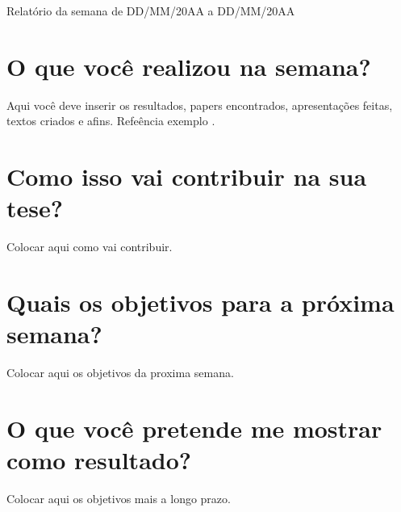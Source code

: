 
\begin{resumo} 
  Relatório da semana de DD/MM/20AA a DD/MM/20AA
\end{resumo}
 
\section{O que você realizou na semana?}
Aqui você deve inserir os resultados, papers encontrados, apresentações feitas, textos criados e afins. Refeência exemplo \cite{Dai2019}.


\section{Como isso vai contribuir na sua tese?} 
Colocar aqui como vai contribuir.


\section{Quais os objetivos para a próxima semana?}
Colocar aqui os objetivos da proxima semana.


\section{O que você pretende me mostrar como resultado?}
Colocar aqui os objetivos mais a longo prazo.
